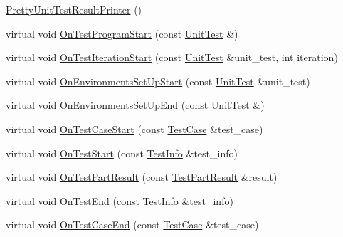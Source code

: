 \begin{DoxyCompactItemize}
\item 
\hyperlink{classtesting_1_1internal_1_1_pretty_unit_test_result_printer_a9219a4263ef0057c98a2a2a41f35ee15}{Pretty\+Unit\+Test\+Result\+Printer} ()
\item 
virtual void \hyperlink{classtesting_1_1internal_1_1_pretty_unit_test_result_printer_a7a6b6de195b4ef3c9f2edd2e6c270f3e}{On\+Test\+Program\+Start} (const \hyperlink{classtesting_1_1_unit_test}{Unit\+Test} \&)
\item 
virtual void \hyperlink{classtesting_1_1internal_1_1_pretty_unit_test_result_printer_abdba10a8c97e272ab4cee97cb652c957}{On\+Test\+Iteration\+Start} (const \hyperlink{classtesting_1_1_unit_test}{Unit\+Test} \&unit\+\_\+test, int iteration)
\item 
virtual void \hyperlink{classtesting_1_1internal_1_1_pretty_unit_test_result_printer_a846a5e82b421e04fcdd2b1b2b64b162f}{On\+Environments\+Set\+Up\+Start} (const \hyperlink{classtesting_1_1_unit_test}{Unit\+Test} \&unit\+\_\+test)
\item 
virtual void \hyperlink{classtesting_1_1internal_1_1_pretty_unit_test_result_printer_aadba892f02606a8b0c5f5982b3553aac}{On\+Environments\+Set\+Up\+End} (const \hyperlink{classtesting_1_1_unit_test}{Unit\+Test} \&)
\item 
virtual void \hyperlink{classtesting_1_1internal_1_1_pretty_unit_test_result_printer_adcb68c729565d4bcdf8418a52902c3de}{On\+Test\+Case\+Start} (const \hyperlink{classtesting_1_1_test_case}{Test\+Case} \&test\+\_\+case)
\item 
virtual void \hyperlink{classtesting_1_1internal_1_1_pretty_unit_test_result_printer_a5078ee71cfa97e37ae7a9366149195c5}{On\+Test\+Start} (const \hyperlink{classtesting_1_1_test_info}{Test\+Info} \&test\+\_\+info)
\item 
virtual void \hyperlink{classtesting_1_1internal_1_1_pretty_unit_test_result_printer_a7589e8df7485349498a3a81bf16e2f68}{On\+Test\+Part\+Result} (const \hyperlink{classtesting_1_1_test_part_result}{Test\+Part\+Result} \&result)
\item 
virtual void \hyperlink{classtesting_1_1internal_1_1_pretty_unit_test_result_printer_a06749ff2b32a16c127374ecd015f13e0}{On\+Test\+End} (const \hyperlink{classtesting_1_1_test_info}{Test\+Info} \&test\+\_\+info)
\item 
virtual void \hyperlink{classtesting_1_1internal_1_1_pretty_unit_test_result_printer_a7a62fe58fa6f6aace813eb62b31e5a51}{On\+Test\+Case\+End} (const \hyperlink{classtesting_1_1_test_case}{Test\+Case} \&test\+\_\+case)

\end{DoxyCompactItemize}
